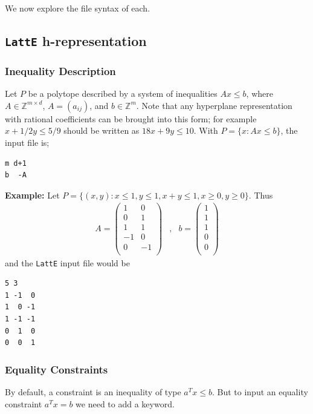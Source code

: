\documentclass{article}
\newcommand{\Z}{{\mathbb Z}}
\newcommand{\latte}{{\tt LattE}\xspace}
\newcommand{\example}{{\bf Example:\space}}
\begin{document}
We now explore the file syntax of each.

\subsection{\latte h-representation}

\subsubsection{Inequality Description}
Let $P$ be a polytope described by a
system of inequalities $Ax\leq b$, where $A\in\Z^{m\times d}$, 
$A=(a_{ij})$, and $b\in\Z^m$. Note that any hyperplane representation with rational coefficients can be brought into this form; for example $x + 1/2y \leq 5/9$ should be written as $18x +9y \leq 10$. With $P=\{x : Ax \leq b\}$, the input file is;
\begin{verbatim}
m d+1
b  -A
\end{verbatim}

\example
Let $P=\{(x,y): x\leq 1, y\leq 1, x+y\leq 1, x\geq 0, y\geq 0\}$.
Thus
\[
\begin{array}{ccc}
A=\left(
\begin{array}{rr} 
 1 &  0 \\ 
 0 &  1 \\ 
 1 &  1 \\
-1 &  0 \\ 
 0 & -1 \\ 
\end{array} 
\right) 
& , &
b = \left( 
\begin{array}{r} 
1 \\ 
1 \\ 
1 \\ 
0 \\
0 \\ 
\end{array} 
\right)
\end{array}
\]
and the {\tt LattE} input file would be
\begin{verbatim}
5 3
1 -1  0
1  0 -1
1 -1 -1
0  1  0
0  0  1
\end{verbatim}

\subsubsection{Equality Constraints}

By default, a constraint is an inequality of type $a^Tx\leq b$. But to input an equality constraint $a^Tx=b$ we need to add a keyword.
\end{document}

